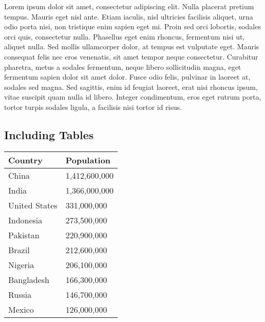 \documentclass[
  letterpaper,
  DIV=11,
  numbers=noendperiod,
  oneside]{scrartcl}
\begin{document}
Lorem ipsum dolor sit amet, consectetur adipiscing elit. Nulla placerat
pretium tempus. Mauris eget nisl ante. Etiam iaculis, nisl ultricies
facilisis aliquet, urna odio porta nisi, non tristique enim sapien eget
mi. Proin sed orci lobortis, sodales orci quis, consectetur nulla.
Phasellus eget enim rhoncus, fermentum nisi ut, aliquet nulla. Sed
mollis ullamcorper dolor, at tempus est vulputate eget. Mauris consequat
felis nec eros venenatis, sit amet tempor neque consectetur. Curabitur
pharetra, metus a sodales fermentum, neque libero sollicitudin magna,
eget fermentum sapien dolor sit amet dolor. Fusce odio felis, pulvinar
in laoreet at, sodales sed magna. Sed sagittis, enim id feugiat laoreet,
erat nisi rhoncus ipsum, vitae suscipit quam nulla id libero. Integer
condimentum, eros eget rutrum porta, tortor turpis sodales ligula, a
facilisis nisi tortor id risus.

\subsection{Including Tables}\label{including-tables}

\begin{longtable}[]{@{}ll@{}}
\toprule\noalign{}
Country & Population \\
\midrule\noalign{}
\endhead
\bottomrule\noalign{}
\endlastfoot
China & 1,412,600,000 \\
India & 1,366,000,000 \\
United States & 331,000,000 \\
Indonesia & 273,500,000 \\
Pakistan & 220,900,000 \\
Brazil & 212,600,000 \\
Nigeria & 206,100,000 \\
Bangladesh & 166,300,000 \\
Russia & 146,700,000 \\
Mexico & 126,000,000 \\
\end{longtable}
\end{document}
